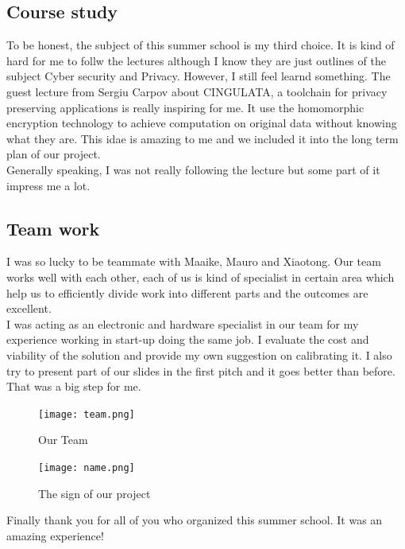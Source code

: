 \documentclass[12pt,twoside]{article}
\begin{document}
\subsection{Course study}
To be honest, the subject of this summer school is my third choice. It is kind of hard for me to follw the lectures although I know they are just outlines of the subject
Cyber security and Privacy. However, I still feel learnd something. The guest lecture from Sergiu Carpov about CINGULATA, a toolchain for privacy preserving applications
is really inspiring for me. It use the homomorphic encryption technology to achieve computation on original data without knowing what they are. This idae is amazing to me and
we included it into the long term plan of our project.\\
Generally speaking, I was not really following the lecture but some part of it impress me a lot.
\subsection{Team work}
I was so lucky to be teammate with Maaike, Mauro and Xiaotong. Our team works well with each other, each of us is kind of specialist in certain area which help
us to efficiently divide work into different parts and the outcomes are excellent.\\
I was acting as an electronic and hardware specialist in our team for my experience working in start-up doing the same job. I evaluate the cost and viability of the solution and 
provide my own suggestion on calibrating it. I also try to present part of our slides in the first pitch and it goes better than before. That was a big step for me.

\begin{figure}[!htb]
    \centering
    \texttt{[image: team.png]}
    \caption{Our Team}
    \label{fig:Our Team}
\end{figure}
\begin{figure}[!htb]
    \centering
    \texttt{[image: name.png]}
    \caption{The sign of our project}
    \label{fig:Our Team}
\end{figure}

Finally thank you for all of you who organized this summer school. It was an amazing experience!

\clearpage


\end{document}
